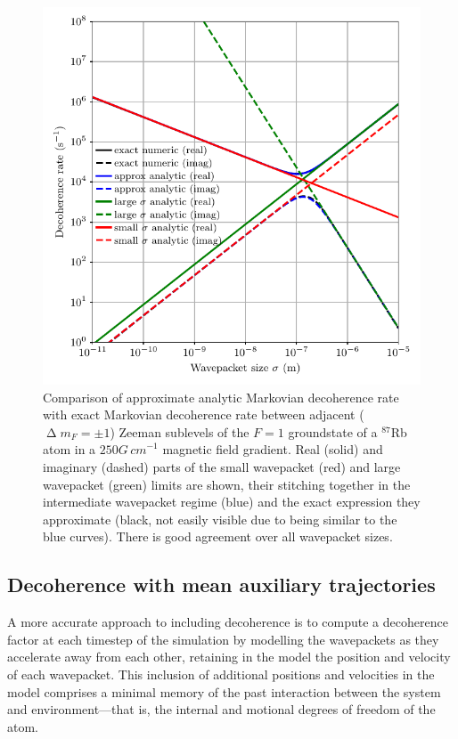\begin{figure}[t]
    \centerfloat
    \includegraphics{figures/hidden_variables/decoherence_rate_example.pdf}
    \caption{Comparison of approximate analytic Markovian decoherence rate with exact Markovian decoherence rate between adjacent ($\upDelta m_F = \pm 1$) Zeeman sublevels of the $F=1$ groundstate of a $^{87}$Rb atom in a $250\unit{G\,cm}^{-1}$ magnetic field gradient. Real (solid) and imaginary (dashed) parts of the small wavepacket (red) and large wavepacket (green) limits are shown, their stitching together in the intermediate wavepacket regime (blue) and the exact expression they approximate (black, not easily visible due to being similar to the blue curves). There is good agreement over all wavepacket sizes.}\label{fig:decoherence_rate_example}
\end{figure}

\subsection{Decoherence with mean auxiliary trajectories}\label{sec:spawned_trajectories}

A more accurate approach to including decoherence is to compute a decoherence factor at each timestep of the simulation by modelling the wavepackets as they accelerate away from each other, retaining in the model the position and velocity of each wavepacket. This inclusion of additional positions and velocities in the model comprises a minimal memory of the past interaction between the system and environment---that is, the internal and motional degrees of freedom of the atom.

